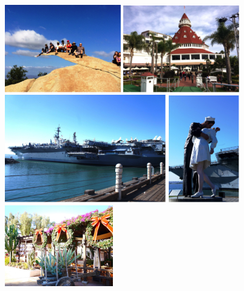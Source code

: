 \documentclass[10pt,a4paper]{book}
\begin{document}
\begin{CJK}{UTF8}{bkai}
\begin{enumerate}
\begin{figure}
\centering
\includegraphics[width=0.45\textwidth]{Pics/potato_chip}
\includegraphics[width=0.45\textwidth]{Pics/coronado}\\
\includegraphics[width=0.625\textwidth]{Pics/midway_1}
\includegraphics[width=0.275\textwidth]{Pics/midway_2}\\
\includegraphics[width=0.42\textwidth]{Pics/oldtownsd}

\end{figure}
\end{enumerate}
\end{CJK}
\end{document}
